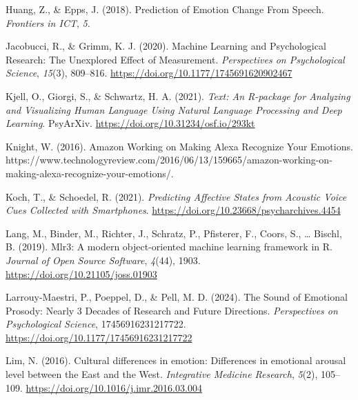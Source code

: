 \documentclass[
  english,
  man,floatsintext]{apa6}
\newlength{\cslhangindent}
\newenvironment{CSLReferences}[2] %
 {%
  \setlength{\parindent}{0pt}
  \ifodd #1 \everypar{\setlength{\hangindent}{\cslhangindent}}\ignorespaces\fi
  \ifnum #2 > 0
  \setlength{\parskip}{#2\baselineskip}
  \fi
 }%
 {}
\begin{document}
\begin{CSLReferences}{1}{0}
\leavevmode{}%
Huang, Z., \& Epps, J. (2018). Prediction of {Emotion Change From Speech}. \emph{Frontiers in ICT}, \emph{5}.

\leavevmode{}%
Jacobucci, R., \& Grimm, K. J. (2020). Machine {Learning} and {Psychological Research}: {The Unexplored Effect} of {Measurement}. \emph{Perspectives on Psychological Science}, \emph{15}(3), 809--816. \url{https://doi.org/10.1177/1745691620902467}

\leavevmode{}%
Kjell, O., Giorgi, S., \& Schwartz, H. A. (2021). \emph{Text: {An R-package} for {Analyzing} and {Visualizing Human Language Using Natural Language Processing} and {Deep Learning}}. PsyArXiv. \url{https://doi.org/10.31234/osf.io/293kt}

\leavevmode{}%
Knight, W. (2016). Amazon {Working} on {Making Alexa Recognize Your Emotions}. https://www.technologyreview.com/2016/06/13/159665/amazon-working-on-making-alexa-recognize-your-emotions/.

\leavevmode{}%
Koch, T., \& Schoedel, R. (2021). \emph{Predicting {Affective States} from {Acoustic Voice Cues Collected} with {Smartphones}}. \url{https://doi.org/10.23668/psycharchives.4454}

\leavevmode{}%
Lang, M., Binder, M., Richter, J., Schratz, P., Pfisterer, F., Coors, S., \ldots{} Bischl, B. (2019). Mlr3: {A} modern object-oriented machine learning framework in {R}. \emph{Journal of Open Source Software}, \emph{4}(44), 1903. \url{https://doi.org/10.21105/joss.01903}

\leavevmode{}%
Larrouy-Maestri, P., Poeppel, D., \& Pell, M. D. (2024). The {Sound} of {Emotional Prosody}: {Nearly} 3 {Decades} of {Research} and {Future Directions}. \emph{Perspectives on Psychological Science}, 17456916231217722. \url{https://doi.org/10.1177/17456916231217722}

\leavevmode{}%
Lim, N. (2016). Cultural differences in emotion: Differences in emotional arousal level between the {East} and the {West}. \emph{Integrative Medicine Research}, \emph{5}(2), 105--109. \url{https://doi.org/10.1016/j.imr.2016.03.004}


\end{CSLReferences}
\end{document}
